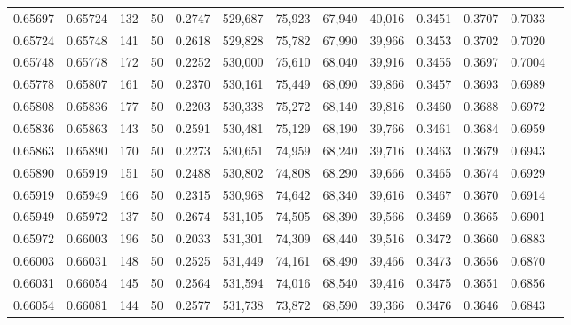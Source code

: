 \begin{tabular}{rrrrrrrrrrrrr}
0.65697 & 0.65724 &   132 &  50 &                                     0.2747 & 529,687 &  75,923 &  67,940 &  40,016 & 0.3451 & 0.3707 & 0.7033 \\
0.65724 & 0.65748 &   141 &  50 &                                     0.2618 & 529,828 &  75,782 &  67,990 &  39,966 & 0.3453 & 0.3702 & 0.7020 \\
0.65748 & 0.65778 &   172 &  50 &                                     0.2252 & 530,000 &  75,610 &  68,040 &  39,916 & 0.3455 & 0.3697 & 0.7004 \\
0.65778 & 0.65807 &   161 &  50 &                                     0.2370 & 530,161 &  75,449 &  68,090 &  39,866 & 0.3457 & 0.3693 & 0.6989 \\
0.65808 & 0.65836 &   177 &  50 &                                     0.2203 & 530,338 &  75,272 &  68,140 &  39,816 & 0.3460 & 0.3688 & 0.6972 \\
0.65836 & 0.65863 &   143 &  50 &                                     0.2591 & 530,481 &  75,129 &  68,190 &  39,766 & 0.3461 & 0.3684 & 0.6959 \\
0.65863 & 0.65890 &   170 &  50 &                                     0.2273 & 530,651 &  74,959 &  68,240 &  39,716 & 0.3463 & 0.3679 & 0.6943 \\
0.65890 & 0.65919 &   151 &  50 &                                     0.2488 & 530,802 &  74,808 &  68,290 &  39,666 & 0.3465 & 0.3674 & 0.6929 \\
0.65919 & 0.65949 &   166 &  50 &                                     0.2315 & 530,968 &  74,642 &  68,340 &  39,616 & 0.3467 & 0.3670 & 0.6914 \\
0.65949 & 0.65972 &   137 &  50 &                                     0.2674 & 531,105 &  74,505 &  68,390 &  39,566 & 0.3469 & 0.3665 & 0.6901 \\
0.65972 & 0.66003 &   196 &  50 &                                     0.2033 & 531,301 &  74,309 &  68,440 &  39,516 & 0.3472 & 0.3660 & 0.6883 \\
0.66003 & 0.66031 &   148 &  50 &                                     0.2525 & 531,449 &  74,161 &  68,490 &  39,466 & 0.3473 & 0.3656 & 0.6870 \\
0.66031 & 0.66054 &   145 &  50 &                                     0.2564 & 531,594 &  74,016 &  68,540 &  39,416 & 0.3475 & 0.3651 & 0.6856 \\
0.66054 & 0.66081 &   144 &  50 &                                     0.2577 & 531,738 &  73,872 &  68,590 &  39,366 & 0.3476 & 0.3646 & 0.6843 \\

\end{tabular}
